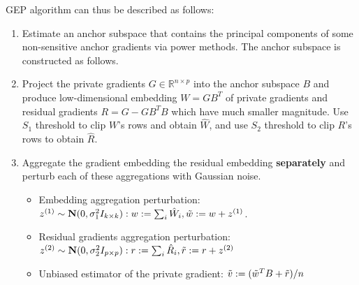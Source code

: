 GEP algorithm can thus be described as follows: 
\begin{enumerate}
    \item Estimate an anchor subspace that contains the principal components of some non-sensitive anchor gradients via power methods. The anchor subspace is constructed as follows. 
    \item Project the private gradients $G \in \mathbb{R}^{n \times p}$ into the anchor subspace $B$ and produce low-dimensional embedding $W=GB^{T}$ of private gradients and  residual gradients  $R=G-GB^{T}B$ which have much smaller magnitude. Use $S_{1}$ threshold to clip $W$'s rows and obtain $\hat{W}$, and use $S_{2}$ threshold to clip $R$'s rows to obtain $\hat{R}$.
    \item Aggregate the gradient embedding the residual embedding \textbf{separately}  and perturb each of these aggregations with Gaussian noise.
    \begin{itemize}
        \item Embedding aggregation perturbation:  $z^{(1)} \sim \mathbf{N}(0, \sigma_{1}^{2}I_{k \times k}): w:=\sum_{i} \hat{W}_{i}, \Tilde{w}:=w+z^{(1)}$. 
        \item Residual gradients aggregation perturbation: $z^{(2)} \sim \mathbf{N}(0,\sigma_{2}^{2}I_{p \times p}): r:=\sum_{i} \hat{R}_{i}, \Tilde{r}:=r+z^{(2)}$
        \item Unbiased estimator of the private gradient: $\Tilde{v}:=(\Tilde{w}^{T}B+\Tilde{r})/n$
    \end{itemize}
    
    
\end{enumerate}


